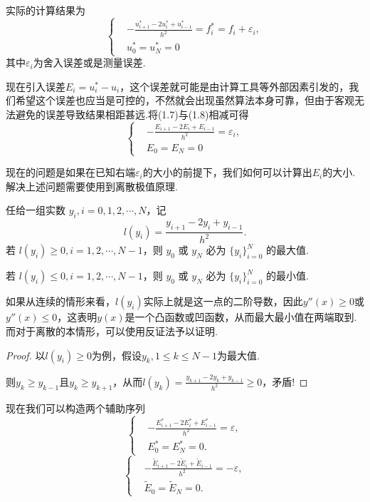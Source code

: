 实际的计算结果为
\begin{equation}
    \left\{\begin{aligned}
        &-\frac{{u}^*_{i+1}-2u^*_i+{u}^*_{i-1}}{h^2}=f_i^*=f_i+\varepsilon_i ,\\
        &{u}^*_0={u}^*_N=0
    \end{aligned}\right.
\end{equation}
其中$\varepsilon_i$为舍入误差或是测量误差.\par
现在引入误差$E_i=u_i^*-u_i$，这个误差就可能是由计算工具等外部因素引发的，我们希望这个误差也应当是可控的，不然就会出现虽然算法本身可靠，但由于客观无法避免的误差导致结果相距甚远.将(1.7)与(1.8)相减可得
\begin{equation}
    \left\{\begin{aligned}
        &-\frac{E_{i+1}-2E_i+E_{i-1}}{h^2}=\varepsilon_i ,\\
        &E_0=E_N=0 
    \end{aligned}\right.
\end{equation}

现在的问题是如果在已知右端$\varepsilon_i$的大小的前提下，我们如何可以计算出$E_i$的大小.解决上述问题需要使用到离散极值原理.\par

\begin{lemma}[离散极值原理]
    任给一组实数 $y_i, i=0,1,2,\cdots, N$，记
    \[
        l(y_i) = \frac{y_{i+1} - 2y_i + y_{i-1}}{h^2}.
    \]
    若 $l(y_i) \geq 0, i=1,2,\cdots, N-1$，则 $y_0$ 或 $y_N$ 必为 $\{y_i\}_{i=0}^N$ 的最大值. \par
    若 $l(y_i) \leq 0, i=1,2,\cdots, N-1$，则 $y_0$ 或 $y_N$ 必为 $\{y_i\}_{i=0}^N$ 的最小值.
\end{lemma}
如果从连续的情形来看，$l(y_i)$实际上就是这一点的二阶导数，因此$y''(x)\geq 0$或$y''(x)\leq 0$，这表明$y(x)$是一个凸函数或凹函数，从而最大最小值在两端取到.而对于离散的本情形，可以使用反证法予以证明.\par
\begin{proof}
以$l(y_i)\geq 0$为例，假设$y_k,1\leq k\leq N-1$为最大值.\par
则$y_k\geq y_{k-1}$且$y_k\geq y_{k+1}$，从而$l(y_k)=\frac{y_{k+1}-2y_k+y_{k-1}}{h^2}\geq 0$，矛盾!
\end{proof}

现在我们可以构造两个辅助序列
\begin{equation}
    \left\{\begin{aligned}
        &-\frac{E_{i+1}^* - 2E_i^* + E_{i-1}^*}{h^2} = \varepsilon, \\
        &E_0^* = E_N^* = 0.
    \end{aligned}\right.
\end{equation}
\begin{equation}
    \left\{\begin{aligned}
        &-\frac{\widetilde{E}_{i+1} - 2\widetilde{E}_i + \widetilde{E}_{i-1}}{h^2} = -\varepsilon, \\
        &\widetilde{E}_0 = \widetilde{E}_N = 0.
    \end{aligned}\right.
\end{equation}

